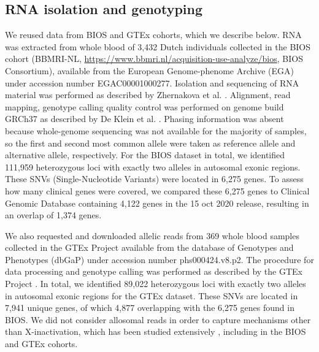 \documentclass{book}
\begin{document}
\begin{refsection}
\subsection*{RNA isolation and genotyping}

We reused data from BIOS and GTEx cohorts, which we describe below.
RNA was extracted from whole blood of 3,432 Dutch individuals collected in the BIOS cohort (BBMRI-NL, \url{https://www.bbmri.nl/acquisition-use-analyze/bios}, BIOS Consortium), available from the European Genome-phenome Archive (EGA) under accession number EGAC00001000277.
Isolation and sequencing of RNA material was performed as described by Zhernakova et al. \cite{Zhernakova2016Identification}.
Alignment, read mapping, genotype calling quality control was performed on genome build GRCh37 as described by De Klein et al. \cite{de2020Imbalanced}.
Phasing information was absent because whole-genome sequencing was not available for the majority of samples, so the first and second most common allele were taken as reference allele and alternative allele, respectively.
For the BIOS dataset in total, we identified 111,959 heterozygous loci with exactly two alleles in autosomal exonic regions.
These SNVs (Single-Nucleotide Variants) were located in 6,275 genes.
To assess how many clinical genes were covered, we compared these 6,275 genes to Clinical Genomic Database \cite{Solomon2013Clinical} containing 4,122 genes in the 15 oct 2020 release, resulting in an overlap of 1,374 genes.

We also requested and downloaded allelic reads from 369 whole blood samples collected in the GTEx Project \cite{Lonsdale2013The} available from the database of Genotypes and Phenotypes (dbGaP) under accession number phs000424.v8.p2.
The procedure for data processing and genotype calling was performed as described by the GTEx Project \cite{Author2017Genetic}.
In total, we identified 89,022 heterozygous loci with exactly two alleles in autosomal exonic regions for the GTEx dataset.
These SNVs are located in 7,941 unique genes, of which 4,877 overlapping with the 6,275 genes found in BIOS.
We did not consider allosomal reads in order to capture mechanisms other than X-inactivation, which has been studied extensively \cite{Riggs1975X}, including in the BIOS \cite{Shvetsova2018Skewed} and GTEx \cite{Tukiainen2017Landscape} cohorts.



\end{refsection}
\end{document}
